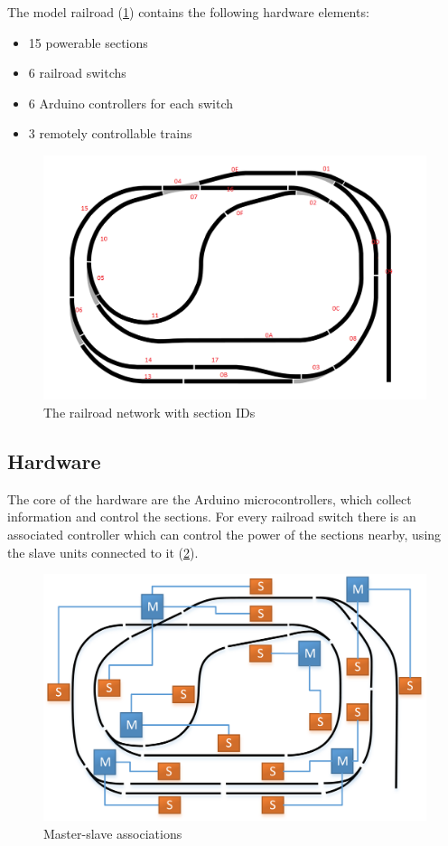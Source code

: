 \noindent The model railroad (\cref{fig:case_study:total_map}) contains the following hardware elements:
\begin{itemize}
	\item 15 powerable sections
	\item 6 railroad switchs
	\item 6 Arduino controllers for each switch
	\item 3 remotely controllable trains
\end{itemize}

\begin{figure}[h]
	\centering
	\includegraphics[width=\linewidth]{include/figures/chapter_6/total_view_1}
	\caption{The railroad network with section IDs}
	\label{fig:case_study:total_map}
\end{figure}

\subsection{Hardware}
The core of the hardware are the Arduino microcontrollers, which collect information and control the sections. For every railroad switch there is an associated controller which can control the power of the sections nearby, using the slave units connected to it (\cref{fig:case_study:master_slave}).

\begin{figure}[h]
	\centering
	\includegraphics[width=\linewidth]{include/figures/chapter_6/railroad_ms}
	\caption{Master-slave associations}
	\label{fig:case_study:master_slave}
\end{figure}

